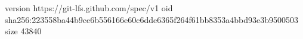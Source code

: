 version https://git-lfs.github.com/spec/v1
oid sha256:223558ba44b9ce6b556166e60c6dde6365f264f61bb8353a4bbd93e3b9500503
size 43840
